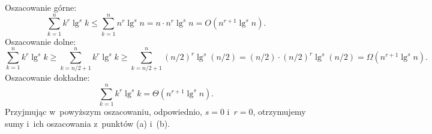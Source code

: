 \subproblem %
Oszacowanie górne:
\[
    \sum_{k=1}^nk^r\lg^sk \le \sum_{k=1}^nn^r\lg^sn = n\cdot n^r\lg^sn = O(n^{r+1}\lg^sn).
\]
Oszacowanie dolne:
\[
    \sum_{k=1}^nk^r\lg^sk \ge \!\!\sum_{k=n/2+1}^n\!\!k^r\lg^sk \ge \!\!\sum_{k=n/2+1}^n\!\!(n/2)^r\lg^s(n/2) = (n/2)\cdot(n/2)^r\lg^s(n/2) = \Omega(n^{r+1}\lg^sn).
\]
Oszacowanie dokładne:
\[
    \sum_{k=1}^nk^r\lg^sk = \Theta(n^{r+1}\lg^sn).
\]
Przyjmując w~powyższym oszacowaniu, odpowiednio, $s=0$ i~$r=0$, otrzymujemy sumy i~ich oszacowania z~punktów (a) i~(b).

\endinput
